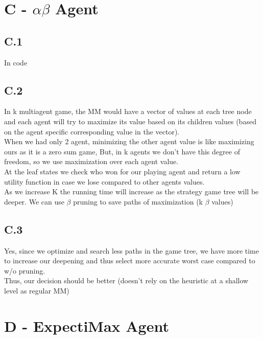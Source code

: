 \documentclass[12pt]{article}
\begin{document}
\section*{C - $\alpha\beta$ Agent}

\subsection*{C.1}
In code 

\subsection*{C.2}
In k multiagent game, the MM would have a vector of values at each tree node and each agent will try to maximize its value based on its children values (based on the agent specific corresponding value in the vector).\\
When we had only 2 agent, minimizing the other agent value is like maximizing ours as it is a zero sum game, But, in k agents we don't have this degree of freedom, so we use maximization over each agent value.\\
At the leaf states we check who won for our playing agent and return a low utility function in case we lose compared to other agents values.\\
As we increase K the running time will increase as the strategy game tree  will be deeper. We can use $\beta$ pruning to save paths of maximization (k $\beta$ values)\\

\begin{comment}
The average branching factor (in the ideal case in which we prune all with ideal children ordering) $b'$ will be $\sqrt[k]{b}$ as the recursion formula (as seen on lecture) for the K case is:
$$T(d)= T(d-1) + (b-1)T(d-(k+1))$$
\end{comment}

\subsection*{C.3}
Yes, since we optimize and search less paths in the game tree, we have more time to increase our deepening and thus select more accurate worst case compared to w/o pruning.\\
Thus, our decision should be better (doesn't rely on the heuristic at a shallow level as regular MM)\\

\section*{D - ExpectiMax Agent}
\end{document}
